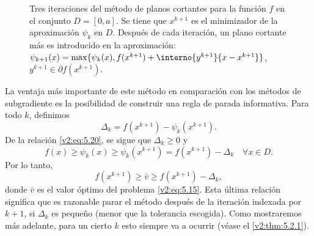 \begin{figure}[htpb]
    \centering
    \caption{Tres iteraciones del método de planos cortantes para la función $f$ en el conjunto $D = [0, a]$. Se tiene que $x^{k+1}$ es el minimizador de la aproximación $\psi_k$ en $D$. Después de cada iteración, un plano cortante más es introducido en la aproximación: $\psi_{k+1}(x) = \max\{\psi_k(x), f(x^{k+1}) + \interno{y^{k+1}}{x - x^{k+1}}\}$, $y^{k+1} \in \partial f(x^{k+1})$.}
    \label{v2:fig:5.2.2}
\end{figure}

La ventaja más importante de este método en comparación con los métodos de subgradiente es la posibilidad de construir una regla de parada informativa. Para todo $k$, definimos
\[
    \Delta_k = f(x^{k+1}) - \psi_k(x^{k+1}).
\]
De la relación \eqref{v2:eq:5.20}, se sigue que $\Delta_k \ge 0$ y
\[
    f(x) \ge \psi_k(x) \ge \psi_k(x^{k+1}) = f(x^{k+1}) - \Delta_k \quad \forall x \in D.
\]
Por lo tanto,
\[
    f(x^{k+1}) \ge \bar{v} \ge f(x^{k+1}) - \Delta_k,
\]
donde $\bar{v}$ es el valor óptimo del problema \eqref{v2:eq:5.15}. Esta última relación significa que es razonable parar el método después de la iteración indexada por $k+1$, si $\Delta_k$ es pequeño (menor que la tolerancia escogida). Como mostraremos más adelante, para un cierto $k$ esto siempre va a ocurrir (véase el \cref{v2:thm:5.2.1}).


